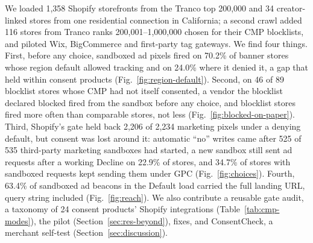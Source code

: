 We loaded 1,358 Shopify storefronts from the Tranco top 200,000 \citep{lepochat2019tranco,tranco_L5PZ4} and 34 creator-linked stores from one residential connection in California; a second crawl added 116 stores from Tranco ranks 200,001--1,000,000 chosen for their CMP blocklists, and piloted Wix, BigCommerce and first-party tag gateways. We find four things. First, before any choice, sandboxed ad pixels fired on 70.2\% of banner stores whose region default allowed tracking and on 24.0\% where it denied it, a gap that held within consent products (Fig.~\ref{fig:region-default}). Second, on 46 of 89 blocklist stores whose CMP had not itself consented, a vendor the blocklist declared blocked fired from the sandbox before any choice, and blocklist stores fired more often than comparable stores, not less (Fig.~\ref{fig:blocked-on-paper}). Third, Shopify's gate held back 2,206 of 2,234 marketing pixels under a denying default, but consent was lost around it: automatic ``no'' writes came after 525 of 535 third-party marketing sandboxes had started, a new sandbox still sent ad requests after a working Decline on 22.9\% of stores, and 34.7\% of stores with sandboxed requests kept sending them under GPC (Fig.~\ref{fig:choices}). Fourth, 63.4\% of sandboxed ad beacons in the Default load carried the full landing URL, query string included (Fig.~\ref{fig:reach}). We also contribute a reusable gate audit, a taxonomy of 24 consent products' Shopify integrations (Table~\ref{tab:cmp-modes}), the pilot (Section~\ref{sec:res-beyond}), fixes, and ConsentCheck, a merchant self-test (Section~\ref{sec:discussion}).
